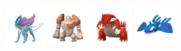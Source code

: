 \documentclass[12pt]{beamer}
\begin{document}
\begin{frame}[label=Grass]
\begin{footnotesize}
\begin{block}{}
\begin{center}
    \includegraphics[width=1.5cm]{../../images/pokemon/suicune}
    \includegraphics[width=1.5cm]{../../images/pokemon/regirock}
    \includegraphics[width=1.5cm]{../../images/pokemon/groudon}
    \includegraphics[width=1.5cm]{../../images/pokemon/kyogre}
\end{center}
\end{block}

\end{footnotesize}
\end{frame}



\end{document}
